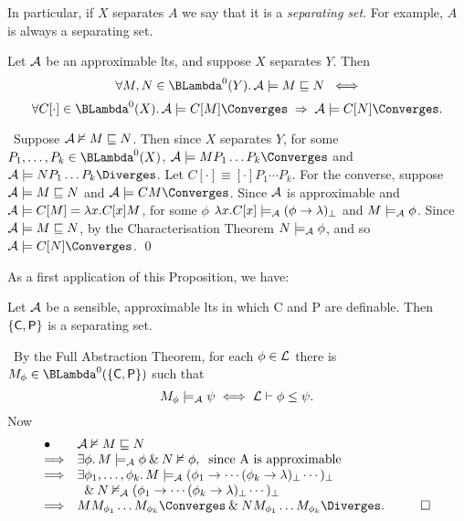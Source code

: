 In particular, if $X$ separates $A$ we say that it is a {\em separating set}. For example, $A$ is always a separating set.

\begin{proposition}
\label{sepl}
Let $\cal A$ be an approximable lts, and suppose $X$ separates $Y$. Then
\[ \forall  M, N \in {\BLambda}^{0}(Y). \, {\cal A} \models M \sqsubseteq N \;\; \Longleftrightarrow \] 
\[ \forall C[\cdot ] \in {\BLambda}^{0}(X). \,
{\cal A} \models C[M] \Converges \; \Rightarrow \; {\cal A} \models C[N] \Converges . \] 
\end{proposition}

\proof\ Suppose ${\cal A} \nvDash M \sqsubseteq N$. 
Then since $X$ separates $Y$, for some $P_{1}, \ldots , P_{k} \in {\BLambda}^{0}(X)$, 
${\cal A} \models M P_{1} \ldots P_{k} \Converges$ and 
${\cal A} \models N P_{1} \ldots P_{k} \Diverges$. 
Let $C[\cdot ] \equiv [\cdot ]P_{1} \cdots P_{k}$. 
For the converse, suppose ${\cal A} \models M \sqsubseteq N$ and ${\cal A} \models C{M} \Converges$. 
Since ${\cal A}$ is approximable and ${\cal A} \models C[M] = \lambda x . C[x] M$, 
for some $\phi$ $\lambda x . C[x] \models_{\cal A} (\phi \rightarrow \lambda )_{\bot}$ and $M \models_{\cal A} \phi$. 
Since ${\cal A} \models M \sqsubseteq N$, by the Characterisation Theorem $N \models_{\cal A} \phi$, and so ${\cal A} \models C[N] \Converges$. \qed

As a first application of this Proposition, we have:

\begin{proposition}
Let $\cal A$ be a sensible, approximable lts in which {\sf C} and {\sf P} are definable. Then $\{ {\sf C}, {\sf P} \}$ is a separating set.
\end{proposition}

\proof\ By the Full Abstraction Theorem, for each $\phi \in {\cal L}$ there is $M_{\phi} \in {\BLambda}^{0}(\{{\sf C}, {\sf P} \})$ such that
\[ M_{\phi} \models_{\cal A} \psi \; \Longleftrightarrow \; {\cal L} \vdash \phi \leq \psi . \]
Now
\[ \begin{array}{ll}
\bullet & {\cal A} \nvDash M \sqsubseteq N  \\ 
\Longrightarrow & \exists \phi . \, M \models_{\cal A} \phi \: \& \: N \nvDash \phi , \;\; 
\mbox{since {\cal A} is approximable} \\
\Longrightarrow & \exists \phi_{1} , \ldots , \phi_{k} . \, M \models_{\cal A} (\phi_{1} 
\rightarrow \cdots (\phi_{k} \rightarrow \lambda )_{\bot} \cdots )_{\bot}  \\ 
& \;\; \& \: N \nvDash_{\cal A} (\phi_{1} \rightarrow \cdots (\phi_{k} \rightarrow \lambda )_{\bot} \cdots )_{\bot}  \\
\Longrightarrow & M M_{\phi_{1}} \ldots M_{\phi_{k}} \Converges \: \& \: N M_{\phi_{1}} \ldots M_{\phi_{k}} \Diverges . \;\;\; \qed
\end{array} \]

